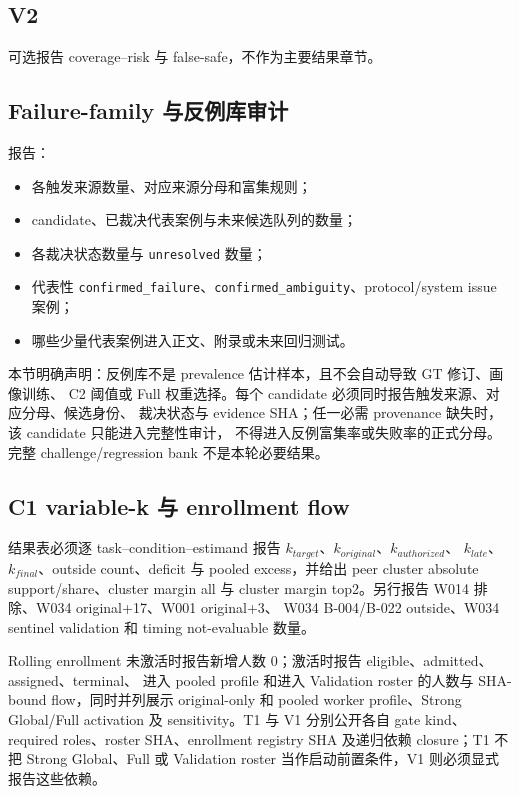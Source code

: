\subsection{V2}

可选报告 coverage--risk 与 false-safe，不作为主要结果章节。

\subsection{Failure-family 与反例库审计}

报告：
\begin{itemize}
  \item 各触发来源数量、对应来源分母和富集规则；
  \item candidate、已裁决代表案例与未来候选队列的数量；
  \item 各裁决状态数量与 \texttt{unresolved} 数量；
  \item 代表性 \texttt{confirmed\_failure}、\texttt{confirmed\_ambiguity}、protocol/system issue 案例；
  \item 哪些少量代表案例进入正文、附录或未来回归测试。
\end{itemize}

本节明确声明：反例库不是 prevalence 估计样本，且不会自动导致 GT 修订、画像训练、
C2 阈值或 Full 权重选择。每个 candidate 必须同时报告触发来源、对应分母、候选身份、
裁决状态与 evidence SHA；任一必需 provenance 缺失时，该 candidate 只能进入完整性审计，
不得进入反例富集率或失败率的正式分母。完整 challenge/regression bank 不是本轮必要结果。

\subsection{C1 variable-k 与 enrollment flow}

结果表必须逐 task--condition--estimand 报告 \(k_{target}\)、\(k_{original}\)、\(k_{authorized}\)、
\(k_{late}\)、\(k_{final}\)、outside count、deficit 与 pooled excess，并给出 peer cluster absolute
support/share、cluster margin all 与 cluster margin top2。另行报告 W014 排除、W034 original+17、W001 original+3、
W034 B-004/B-022 outside、W034 sentinel validation 和 timing not-evaluable 数量。

Rolling enrollment 未激活时报告新增人数 0；激活时报告 eligible、admitted、assigned、terminal、
进入 pooled profile 和进入 Validation roster 的人数与 SHA-bound flow，同时并列展示 original-only
和 pooled worker profile、Strong Global/Full activation 及 sensitivity。T1 与 V1 分别公开各自
gate kind、required roles、roster SHA、enrollment registry SHA 及递归依赖 closure；T1 不把
Strong Global、Full 或 Validation roster 当作启动前置条件，V1 则必须显式报告这些依赖。

